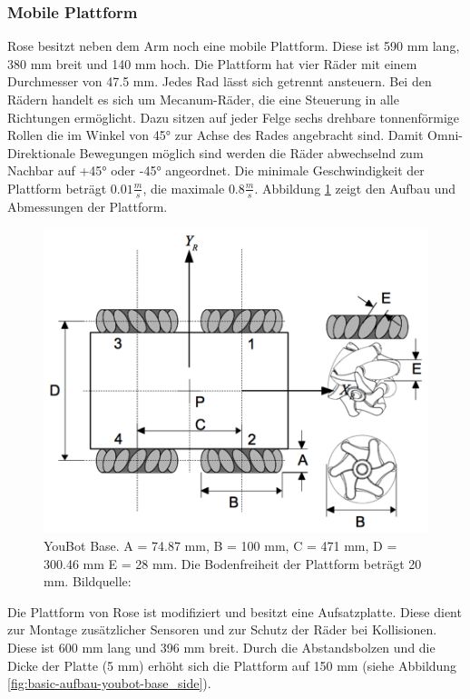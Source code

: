 \subsubsection{Mobile Plattform}
Rose besitzt neben dem Arm noch eine mobile Plattform. Diese ist 590 mm lang, 380 mm breit und 140 mm hoch. Die Plattform hat vier Räder mit einem Durchmesser von 47.5 mm. Jedes Rad lässt sich getrennt ansteuern. Bei den Rädern handelt es sich um Mecanum-Räder, die eine Steuerung in alle Richtungen ermöglicht. Dazu sitzen auf jeder Felge sechs drehbare tonnenförmige Rollen die im Winkel von 45° zur Achse des Rades angebracht sind. Damit Omni-Direktionale Bewegungen möglich sind werden die Räder abwechselnd zum Nachbar auf +45° oder -45° angeordnet. Die minimale Geschwindigkeit der Plattform beträgt $0.01\frac{m}{s}$, die maximale  $0.8\frac{m}{s}$. Abbildung \ref{fig:basic-aufbau-youbot-base} zeigt den Aufbau und Abmessungen der Plattform. 

\begin{figure}[H]
	\centering
	\includegraphics[scale=0.8]{fig/kukabase}   
	\caption[YouBot Base]{YouBot Base. A = 74.87 mm, B = 100 mm, C = 471 mm, D = 300.46 mm E = 28 mm. Die Bodenfreiheit der Plattform beträgt 20 mm. Bildquelle: \cite{monikaflorekjasinska2015}}
	\label{fig:basic-aufbau-youbot-base}
\end{figure}

Die Plattform von Rose ist modifiziert und besitzt eine Aufsatzplatte. Diese dient zur Montage zusätzlicher Sensoren und zur Schutz der Räder bei Kollisionen. Diese ist 600 mm lang und 396 mm breit. Durch die Abstandsbolzen und die Dicke der Platte (5 mm) erhöht sich die Plattform auf 150 mm (siehe Abbildung \ref{fig:basic-aufbau-youbot-base_side}).  


